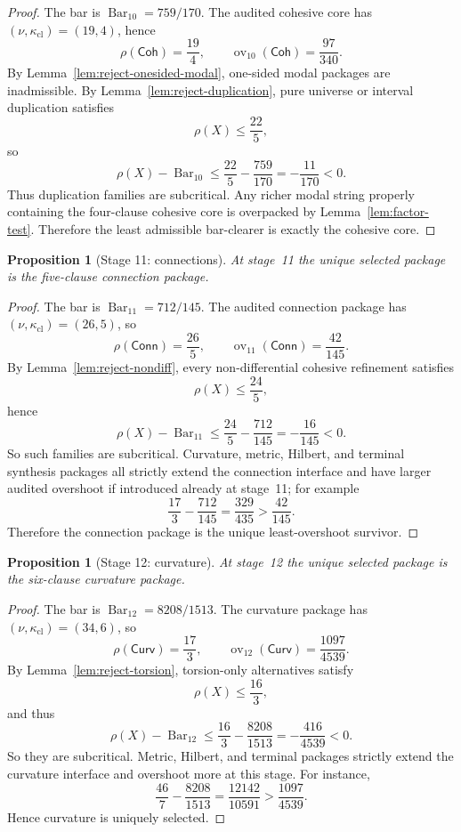 \documentclass{lmcs}
\theoremstyle{plain}
\newtheorem{prop}[thm]{Proposition}
\theoremstyle{definition}
\theoremstyle{remark}
\newcommand{\SelBar}{\ensuremath{\operatorname{Bar}}}
\newcommand{\ov}{\ensuremath{\operatorname{ov}}}
\begin{document}
\begin{proof}
The bar is $\SelBar_{10}=759/170$.
The audited cohesive core has $(\nu,\kappa_{\mathrm{cl}})=(19,4)$, hence
\[
  \rho(\mathsf{Coh})=\frac{19}{4},\qquad
  \ov_{10}(\mathsf{Coh})=\frac{97}{340}.
\]
By Lemma~\ref{lem:reject-onesided-modal}, one-sided modal packages are inadmissible.
By Lemma~\ref{lem:reject-duplication}, pure universe or interval duplication satisfies
\[
  \rho(X)\le \frac{22}{5},
\]
so
\[
  \rho(X)-\SelBar_{10}\le \frac{22}{5}-\frac{759}{170}=-\frac{11}{170}<0.
\]
Thus duplication families are subcritical.
Any richer modal string properly containing the four-clause cohesive core is overpacked by Lemma~\ref{lem:factor-test}.
Therefore the least admissible bar-clearer is exactly the cohesive core.
\end{proof}

\begin{prop}[Stage 11: connections]
\label{prop:appendix-stage11}
At stage~11 the unique selected package is the five-clause connection package.
\end{prop}

\begin{proof}
The bar is $\SelBar_{11}=712/145$.
The audited connection package has $(\nu,\kappa_{\mathrm{cl}})=(26,5)$, so
\[
  \rho(\mathsf{Conn})=\frac{26}{5},\qquad
  \ov_{11}(\mathsf{Conn})=\frac{42}{145}.
\]
By Lemma~\ref{lem:reject-nondiff}, every non-differential cohesive refinement satisfies
\[
  \rho(X)\le \frac{24}{5},
\]
hence
\[
  \rho(X)-\SelBar_{11}\le \frac{24}{5}-\frac{712}{145}=-\frac{16}{145}<0.
\]
So such families are subcritical.
Curvature, metric, Hilbert, and terminal synthesis packages all strictly extend the connection interface and have larger audited overshoot if introduced already at stage~11; for example
\[
  \frac{17}{3}-\frac{712}{145}=\frac{329}{435}>\frac{42}{145}.
\]
Therefore the connection package is the unique least-overshoot survivor.
\end{proof}

\begin{prop}[Stage 12: curvature]
\label{prop:appendix-stage12}
At stage~12 the unique selected package is the six-clause curvature package.
\end{prop}

\begin{proof}
The bar is $\SelBar_{12}=8208/1513$.
The curvature package has $(\nu,\kappa_{\mathrm{cl}})=(34,6)$, so
\[
  \rho(\mathsf{Curv})=\frac{17}{3},\qquad
  \ov_{12}(\mathsf{Curv})=\frac{1097}{4539}.
\]
By Lemma~\ref{lem:reject-torsion}, torsion-only alternatives satisfy
\[
  \rho(X)\le \frac{16}{3},
\]
and thus
\[
  \rho(X)-\SelBar_{12}\le \frac{16}{3}-\frac{8208}{1513}=-\frac{416}{4539}<0.
\]
So they are subcritical.
Metric, Hilbert, and terminal packages strictly extend the curvature interface and overshoot more at this stage.
For instance,
\[
  \frac{46}{7}-\frac{8208}{1513}=\frac{12142}{10591}>\frac{1097}{4539}.
\]
Hence curvature is uniquely selected.
\end{proof}
\end{document}
